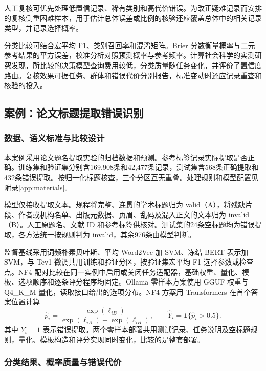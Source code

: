 \documentclass[UTF8,a4paper,zihao=-4,fontset=fandol]{ctexart}
\newcommand{\ind}{\mathbf 1}
\begin{document}
人工复核可优先处理低置信记录、稀有类别和高代价错误。为改正疑难记录而安排的复核侧重困难样本，用于估计总体误差或比例的核验还应覆盖总体中的相关记录类型，并记录选择概率。

分类比较可结合宏平均 F1、类别召回率和混淆矩阵。Brier 分数衡量概率与二元参考结果的平方误差，校准分析对照预测概率与参考频率\citep{guo2017}。计算社会科学的实测研究发现，所比较的决策模型查询费用较低，分类质量随任务变化，并评价了置信度路由\citep{ibrahim2026}。复核效果可据任务、群体和错误代价分别报告，标准变动时还应记录重查和核验的投入。

\subsection{案例：论文标题提取错误识别}\label{sec:title-case}

\subsubsection{数据、语义标准与比较设计}

本案例采用论文题名提取实验的归档数据和预测\citep{title-case}。参考标签记录实际提取是否正确。训练集和验证集分别含169,908条和42,477条记录，测试集含568条正确提取和432条错误提取。按归一化标题核查，三个分区互无重叠。处理规则和模型配置见附录\ref{app:materials}。

模型仅接收提取文本。规程将完整、连贯的学术标题归为 valid（A），将残缺片段、作者或机构名单、出版元数据、页眉、乱码及混入正文的文本归为 invalid（B）。人工原题名、文献 ID 和参考标签供核对。测试集的24条空标题均为错误提取，各方法统一按规则判为 invalid，其余976条由模型判断。

监督基线采用词频朴素贝叶斯、平均 Word2Vec 加 SVM、冻结 BERT 表示加 SVM，与 Tev1 微调共用训练和验证分区，按验证集宏平均 F1 选择参数或检查点。NF4 配对比较在同一实例中启用或关闭任务适配器，基础权重、量化、模板、选项顺序和逐条评分程序均固定。Ollama 零样本方案使用 GGUF 权重与 Q4\_K\_M 量化，读取接口给出的选项分布。NF4 方案用 Transformers 在首个答案位置计算
\begin{equation}
 \widehat p_i=\frac{\exp(\ell_{iB})}{\exp(\ell_{iA})+\exp(\ell_{iB})},\qquad
 \widehat Y_i=\ind\{\widehat p_i>0.5\}.
 \label{eq:title-probability}
\end{equation}
其中 $Y_i=1$ 表示错误提取。两个零样本部署共用测试记录、任务说明及空标题规则，量化、模板构造和评分实现同时变化，比较的是整套部署。

\subsubsection{分类结果、概率质量与错误代价}
\end{document}
